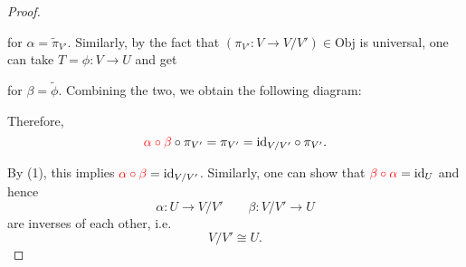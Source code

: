 \begin{proof}
\begin{enumerate}
  for $\alpha = \widetilde{\pi}_{V'}$. Similarly, by the fact that $(\pi_{V'}: V \to V/V') \in \mathrm{Obj}$ is universal, one can take $T = \phi: V \to U$ and get

\begin{figure}[h!]
  \centering
  \end{figure}

  for $\beta = \widetilde{\phi}$. Combining the two, we obtain the following diagram:

  \begin{figure}[h!]
  \centering
  \end{figure}

  Therefore, 
  $${\color{red} \alpha \circ \beta} \circ \pi_{V'} = \pi_{V'} = \mathrm{id}_{V/V'} \circ \pi_{V'}.$$ 
\end{enumerate}
By (1), this implies ${\color{red} \alpha \circ \beta} = \mathrm{id}_{V/V'}$. Similarly, one can show that ${\color{red} \beta \circ \alpha} = \mathrm{id}_U$ and hence
$$\alpha: U \to V/V' \quad \quad \beta:V/V' \to U$$
are inverses of each other, i.e.
$$V/V' \cong U.$$
\end{proof}


